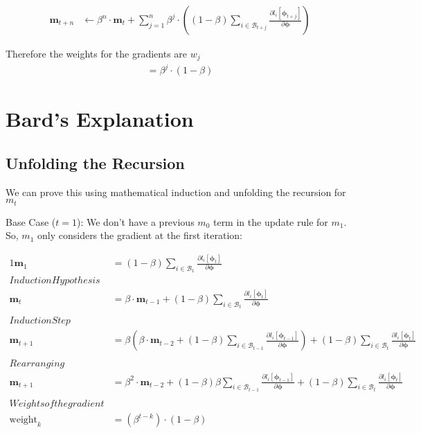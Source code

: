 \documentclass{article}
\begin{document}
\begin{align*}
    \boldsymbol{m}_{t+n} &\leftarrow \beta^{n} \cdot 
    \boldsymbol{m}_{t}
    + \sum_{j = 1}^{n}\beta^{j} \cdot 
    \left(
        (1 - \beta)\sum_{i \in \mathcal{B}_{t+j}}
         \frac{\partial{l_{i}[\boldsymbol{\phi}_{t+j}]}}{\partial{\boldsymbol{\phi}}}
    \right)
\end{align*}

Therefore the weights for the gradients are $w_j$
\begin{align*}
     = \beta^{j} \cdot (1 - \beta)
\end{align*}


\section{Bard's Explanation}

\subsection{Unfolding the Recursion}

We can prove this using mathematical induction and unfolding the recursion for $ m_{t} $

Base Case ($t = 1$):
We don't have a previous $m_{0}$ term in the update rule for $m_{1}$. So, $m_{1}$ only considers the gradient at the first iteration:

\begin{alignat*}{1}
    \boldsymbol{m}_1 &= (1 - \beta) \sum_{i \in \mathcal{B}_1} \frac{\partial{l_i[\boldsymbol{\phi}_t]}}{\partial{\boldsymbol{\phi}}}
    \\
    Induction Hypothesis
    \\
    \boldsymbol{m}_t &= \beta \cdot \boldsymbol{m}_{t-1} + (1 - \beta) \sum_{i \in \mathcal{B}_t} \frac{\partial{l_i[\boldsymbol{\phi}_t]}}{\partial{\boldsymbol{\phi}}}
    \\
    \\ Induction Step
    \\
    \boldsymbol{m}_{t+1} &= \beta \left( \beta \cdot \boldsymbol{m}_{t-2} + (1 - \beta) \sum_{i \in \mathcal{B}_{t-1}} \frac{\partial{l_i[\boldsymbol{\phi}_{t-1}]}}{\partial{\boldsymbol{\phi}}} \right) + (1 - \beta) \sum_{i \in \mathcal{B}_t} \frac{\partial{l_i[\boldsymbol{\phi}_t]}}{\partial{\boldsymbol{\phi}}}
    \\
    \\ Rearranging
    \\
    \boldsymbol{m}_{t+1} &= \beta^2 \cdot \boldsymbol{m}_{t-2} + (1 - \beta) \beta \sum_{i \in \mathcal{B}_{t-1}} \frac{\partial{l_i[\boldsymbol{\phi}_{t-1}]}}{\partial{\boldsymbol{\phi}}} + (1 - \beta) \sum_{i \in \mathcal{B}_t} \frac{\partial{l_i[\boldsymbol{\phi}_t]}}{\partial{\boldsymbol{\phi}}}
    \\
    \\ Weights of the gradient
    \\
    \text{weight}_k &= (\beta^{t-k}) \cdot (1 - \beta)
\end{alignat*}
\end{document}
